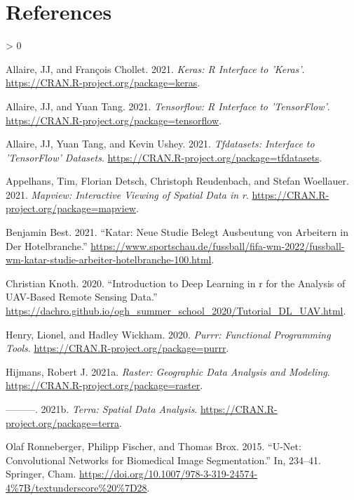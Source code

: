 \documentclass[
]{article}
\newlength{\cslhangindent}
\newenvironment{CSLReferences}[2] %
 {%
  \setlength{\parindent}{0pt}
  \ifodd #1 \everypar{\setlength{\hangindent}{\cslhangindent}}\ignorespaces\fi
  \ifnum #2 > 0
  \setlength{\parskip}{#2\baselineskip}
  \fi
 }%
 {}
\begin{document}
\hypertarget{references}{%
\section{References}\label{references}}

\hypertarget{refs}{}
\begin{CSLReferences}{1}{0}
\leavevmode\hypertarget{ref-Keras}{}%
Allaire, JJ, and François Chollet. 2021. \emph{Keras: R Interface to
'Keras'}. \url{https://CRAN.R-project.org/package=keras}.

\leavevmode\hypertarget{ref-TensorFlow}{}%
Allaire, JJ, and Yuan Tang. 2021. \emph{Tensorflow: R Interface to
'TensorFlow'}. \url{https://CRAN.R-project.org/package=tensorflow}.

\leavevmode\hypertarget{ref-tfdatasets}{}%
Allaire, JJ, Yuan Tang, and Kevin Ushey. 2021. \emph{Tfdatasets:
Interface to 'TensorFlow' Datasets}.
\url{https://CRAN.R-project.org/package=tfdatasets}.

\leavevmode\hypertarget{ref-mapview}{}%
Appelhans, Tim, Florian Detsch, Christoph Reudenbach, and Stefan
Woellauer. 2021. \emph{Mapview: Interactive Viewing of Spatial Data in
r}. \url{https://CRAN.R-project.org/package=mapview}.

\leavevmode\hypertarget{ref-benjaminBest}{}%
Benjamin Best. 2021. {``Katar: Neue Studie Belegt Ausbeutung von
Arbeitern in Der Hotelbranche.''}
\url{https://www.sportschau.de/fussball/fifa-wm-2022/fussball-wm-katar-studie-arbeiter-hotelbranche-100.html}.

\leavevmode\hypertarget{ref-ChristianKnoth.2020}{}%
Christian Knoth. 2020. {``Introduction to Deep Learning in r for the
Analysis of UAV-Based Remote Sensing Data.''}
\url{https://dachro.github.io/ogh_summer_school_2020/Tutorial_DL_UAV.html}.

\leavevmode\hypertarget{ref-purrr}{}%
Henry, Lionel, and Hadley Wickham. 2020. \emph{Purrr: Functional
Programming Tools}. \url{https://CRAN.R-project.org/package=purrr}.

\leavevmode\hypertarget{ref-raster}{}%
Hijmans, Robert J. 2021a. \emph{Raster: Geographic Data Analysis and
Modeling}. \url{https://CRAN.R-project.org/package=raster}.

\leavevmode\hypertarget{ref-terra}{}%
---------. 2021b. \emph{Terra: Spatial Data Analysis}.
\url{https://CRAN.R-project.org/package=terra}.

\leavevmode\hypertarget{ref-OlafRonneberger.2015}{}%
Olaf Ronneberger, Philipp Fischer, and Thomas Brox. 2015. {``U-Net:
Convolutional Networks for Biomedical Image Segmentation.''} In,
234--41. {Springer, Cham}.
\url{https://doi.org/10.1007/978-3-319-24574-4\%7B/textunderscore\%20\%7D28}.


\end{CSLReferences}
\end{document}
